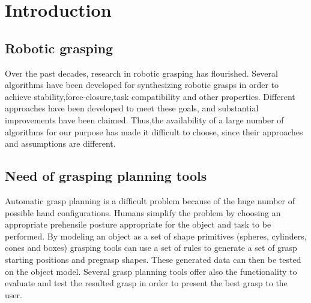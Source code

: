 \setcounter{secnumdepth}{5}
\usepackage{amsmath}
\usepackage{amssymb} %
\usepackage{algorithm}
\usepackage{algpseudocode}
\usepackage{bm}
\usepackage{subcaption} %
\usepackage{algpseudocode}
\usepackage{pifont}
\usepackage{graphicx} %
\usepackage{epstopdf} %
\usepackage{listings}
\usepackage{xcolor}
\usepackage{verbatim}
\usepackage{hyperref}
\usepackage{enumitem}
\usepackage{subfloat}
\usepackage{float}
\graphicspath{ {fig/} } %
\newcommand{\inr}[1]{\in \mathbb{R}^#1}

\usepackage{amsthm} %
\newtheorem{definition}{Definition}[section]
\newtheorem*{remark}{Remark}
\newpage


\titleGM %
\tableofcontents
\newpage
{}
\chapter{Introduction}

\section{Robotic grasping}
Over the past decades, research in robotic grasping has flourished. Several algorithms have been developed for synthesizing robotic grasps in order to achieve stability,force-closure,task compatibility and other properties. Different approaches have been developed to meet these goals, and substantial improvements have been claimed. Thus,the availability of a large number of algorithms
for our purpose has made it difficult to choose, since their approaches and assumptions are different.
\section{Need of grasping planning tools}
\par
Automatic grasp planning is a difficult problem because of the huge number of possible hand configurations. Humans simplify the problem by choosing an appropriate prehensile posture appropriate for the object and task to be performed. By modeling an object as a set of shape primitives (spheres, cylinders, cones and boxes) grasping tools can use a set of rules to generate a set of grasp starting positions and pregrasp shapes. These generated data can then be tested on the object model. Several grasp planning tools offer also the functionality to evaluate and test the resulted grasp in order to present the best grasp to the user.
